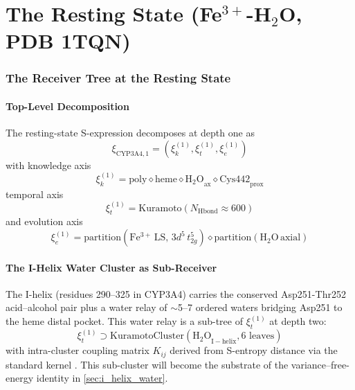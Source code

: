 \documentclass[11pt,twocolumn,a4paper]{article}
\theoremstyle{definition}
\theoremstyle{remark}
\newcommand{\Sexp}{\xi}
\begin{document}
\part{The Resting State (Fe$^{3+}$-H$_2$O, PDB 1TQN)}

\section{The Receiver Tree at the Resting State}
\label{sec:resting_tree}

\subsection{Top-Level Decomposition}

The resting-state S-expression decomposes at depth one as
\begin{equation}
\Sexp_{\mathrm{CYP3A4,1}} = (\Sexp_k^{(1)}, \Sexp_t^{(1)}, \Sexp_e^{(1)})
\label{eq:resting_decomp}
\end{equation}
with knowledge axis
\begin{equation}
\Sexp_k^{(1)} = \mathrm{poly} \diamond \mathrm{heme} \diamond \mathrm{H_2O}_{\mathrm{ax}} \diamond \mathrm{Cys442}_{\mathrm{prox}}
\end{equation}
temporal axis
\begin{equation}
\Sexp_t^{(1)} = \mathrm{Kuramoto}(N_{\mathrm{Hbond}} \approx 600)
\end{equation}
and evolution axis
\begin{equation}
\Sexp_e^{(1)} = \mathrm{partition}(\mathrm{Fe^{3+}\,LS},\,3d^5\,t_{2g}^5)
\diamond \mathrm{partition}(\mathrm{H_2O\,axial})
\end{equation}

\subsection{The I-Helix Water Cluster as Sub-Receiver}

The I-helix (residues 290--325 in CYP3A4) carries the conserved Asp251-Thr252 acid--alcohol pair plus a water relay of $\sim$5--7 ordered waters bridging Asp251 to the heme distal pocket. This water relay is a sub-tree of $\Sexp_t^{(1)}$ at depth two:
\begin{equation}
\Sexp_t^{(1)} \supset \mathrm{KuramotoCluster}(\mathrm{H_2O}_{\mathrm{I-helix}}, 6 \text{ leaves})
\end{equation}
with intra-cluster coupling matrix $K_{ij}$ derived from S-entropy distance via the standard kernel \citep{sachikonye2025_paper1, sachikonye2025_fold}. This sub-cluster will become the substrate of the variance--free-energy identity in \cref{sec:i_helix_water}.
\end{document}
